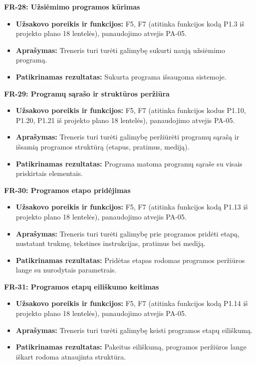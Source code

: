 \vspace{0.3cm}
\noindent\textbf{FR-28: Užsiėmimo programos kūrimas}
\begin{itemize}
    \item \textbf{Užsakovo poreikis ir funkcijos:} F5, F7 (atitinka funkcijos kodą P1.3 iš projekto plano 18 lentelės), panaudojimo atvejis PA-05.
    \item \textbf{Aprašymas:} Treneris turi turėti galimybę sukurti naują užsiėmimo programą.
    \item \textbf{Patikrinamas rezultatas:} Sukurta programa išsaugoma sistemoje.
\end{itemize}

\vspace{0.3cm}
\noindent\textbf{FR-29: Programų sąrašo ir struktūros peržiūra}
\begin{itemize}
    \item \textbf{Užsakovo poreikis ir funkcijos:} F5, F7 (atitinka funkcijos kodus P1.10, P1.20, P1.21 iš projekto plano 18 lentelės), panaudojimo atvejis PA-05.
    \item \textbf{Aprašymas:} Treneris turi turėti galimybę peržiūrėti programų sąrašą ir išsamią programos struktūrą (etapus, pratimus, mediją).
    \item \textbf{Patikrinamas rezultatas:} Programa matoma programų sąraše su visais priskirtais elementais.
\end{itemize}

\vspace{0.3cm}
\noindent\textbf{FR-30: Programos etapo pridėjimas}
\begin{itemize}
    \item \textbf{Užsakovo poreikis ir funkcijos:} F5, F7 (atitinka funkcijos kodą P1.13 iš projekto plano 18 lentelės), panaudojimo atvejis PA-05.
    \item \textbf{Aprašymas:} Treneris turi turėti galimybę prie programos pridėti etapą, nustatant trukmę, tekstines instrukcijas, pratimus bei mediją.
    \item \textbf{Patikrinamas rezultatas:} Pridėtas etapas rodomas programos peržiūros lange su nurodytais parametrais.
\end{itemize}

\vspace{0.3cm}
\noindent\textbf{FR-31: Programos etapų eiliškumo keitimas}
\begin{itemize}
    \item \textbf{Užsakovo poreikis ir funkcijos:} F5, F7 (atitinka funkcijos kodą P1.14 iš projekto plano 18 lentelės), panaudojimo atvejis PA-05.
    \item \textbf{Aprašymas:} Treneris turi turėti galimybę keisti programos etapų eiliškumą.
    \item \textbf{Patikrinamas rezultatas:} Pakeitus eiliškumą, programos peržiūros lange iškart rodoma atnaujinta struktūra.
\end{itemize}

